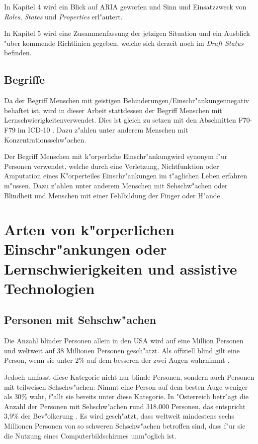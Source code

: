 \documentclass[a4paper,bibtotoc,oneside]{scrbook}
\begin{document}
In Kapitel 4 wird ein Blick auf ARIA geworfen und Sinn und Einsatzzweck von \emph{Roles}, \emph{States} und \emph{Properties} erl"autert.

In Kapitel 5 wird eine Zusammenfassung der jetzigen Situation und ein Ausblick "uber kommende Richtlinien gegeben, welche sich derzeit noch im \emph{Draft Status} befinden.

\section{Begriffe}
Da der Begriff \glqq Menschen mit geistigen Behinderungen/Einschr"ankungen\grqq negativ behaftet ist, wird in dieser Arbeit stattdessen der Begriff \glqq Menschen mit Lernschwierigkeiten\grqq  verwendet. Dies ist gleich zu setzen mit den Abschnitten F70-F79 im ICD-10 \cite{icd10}. Dazu z"ahlen unter anderem Menschen mit Konzentrationsschw"achen.


Der Begriff \glqq Menschen mit k"orperliche Einschr"ankung\grqq wird synonym f"ur Personen verwendet, welche durch eine Verletzung, Nichtfunktion oder Amputation eines K"orperteiles Einschr"ankungen im t"aglichen Leben erfahren m"ussen. Dazu z"ahlen unter anderem Menschen mit Sehschw"achen oder Blindheit und Menschen mit einer Fehlbildung der Finger oder H"ande.

\chapter{Arten von k"orperlichen Einschr"ankungen oder Lernschwierigkeiten
 und assistive Technologien}

\section{Personen mit Sehschw"achen}
Die Anzahl blinder Personen allein in den USA wird auf eine Million Personen und weltweit auf 38 Millionen Personen gesch"atzt\cite[S. 1]{screen_read}.  Als offiziell blind gilt eine Person, wenn sie unter 2\% auf dem besseren der zwei Augen wahrnimmt \cite[S. 12]{understand_acc}. 

Jedoch umfasst diese Kategorie nicht nur blinde Personen, sondern auch Personen mit teilweisen Sehschw"achen: Nimmt eine Person auf dem besten Auge weniger als 30\% wahr, f"allt sie bereits unter diese Kategorie\cite[S. 12]{understand_acc}. In "Osterreich betr"agt die Anzahl der Personen mit Sehschw"achen rund 318.000 Personen, das entspricht 3,9\% der Bev"olkerung \cite[S. 13]{stat_austria}. Es wird gesch"atzt, dass weltweit mindestens sechs Millionen Personen von so schweren Sehschw"achen betroffen sind, dass f"ur sie die Nutzung eines Computerbildschirmes unm"oglich ist\cite[S. 249]{screen_read_frust}.
\end{document}
